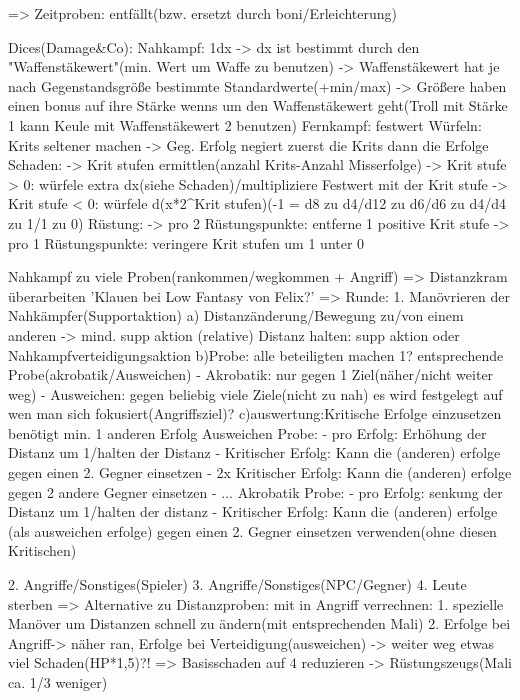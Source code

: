 	=> Zeitproben: entfällt(bzw. ersetzt durch boni/Erleichterung)
	
Dices(Damage&Co):
	Nahkampf: 1dx
		-> dx ist bestimmt durch den "Waffenstäkewert"(min. Wert um Waffe zu benutzen)
		-> Waffenstäkewert hat je nach Gegenstandsgröße bestimmte Standardwerte(+min/max)
		-> Größere haben einen bonus auf ihre Stärke wenns um den Waffenstäkewert geht(Troll mit Stärke 1 kann Keule mit Waffenstäkewert 2 benutzen)
	Fernkampf: festwert
	Würfeln: Krits seltener machen -> Geg. Erfolg negiert zuerst die Krits dann die Erfolge
	Schaden: 
		-> Krit stufen ermittlen(anzahl Krits-Anzahl Misserfolge)
		-> Krit stufe > 0: würfele extra dx(siehe Schaden)/multipliziere Festwert mit der Krit stufe
		-> Krit stufe < 0: würfele d(x*2^Krit stufen)(-1 = d8 zu d4/d12 zu d6/d6 zu d4/d4 zu 1/1 zu 0)
	Rüstung:
		-> pro 2 Rüstungspunkte: entferne 1 positive Krit stufe
		-> pro 1 Rüstungspunkte: veringere Krit stufen um 1 unter 0


Nahkampf zu viele Proben(rankommen/wegkommen + Angriff)
	=> Distanzkram überarbeiten
		'Klauen bei Low Fantasy von Felix?'
			=> Runde: 
				1. Manövrieren der Nahkämpfer(Supportaktion)
					a)
						Distanzänderung/Bewegung zu/von einem anderen -> mind. supp aktion
						(relative) Distanz halten: supp aktion oder Nahkampfverteidigungsaktion
					b)Probe:
						alle beteiligten machen 1? entsprechende Probe(akrobatik/Ausweichen)
							- Akrobatik: nur gegen 1 Ziel(näher/nicht weiter weg)
							- Ausweichen: gegen beliebig viele Ziele(nicht zu nah)
						es wird festgelegt auf wen man sich fokusiert(Angriffsziel)?
					c)auswertung:Kritische Erfolge einzusetzen benötigt min. 1 anderen Erfolg
						Ausweichen Probe:
							- pro Erfolg: Erhöhung der Distanz um 1/halten der Distanz
							- Kritischer Erfolg: Kann die (anderen) erfolge gegen einen 2. Gegner einsetzen
							- 2x Kritischer Erfolg: Kann die (anderen) erfolge gegen 2 andere Gegner einsetzen
							- ...
 						Akrobatik Probe:
							- pro Erfolg: senkung der Distanz um 1/halten der distanz
							- Kritischer Erfolg: Kann die (anderen) erfolge (als ausweichen erfolge) gegen einen 2. Gegner einsetzen
verwenden(ohne diesen Kritischen)
												
				2. Angriffe/Sonstiges(Spieler)
				3. Angriffe/Sonstiges(NPC/Gegner)
				4. Leute sterben
		=> Alternative zu Distanzproben: mit in Angriff verrechnen: 
				1. spezielle Manöver um Distanzen schnell zu ändern(mit entsprechenden Mali)
				2. Erfolge bei Angriff-> näher ran, Erfolge bei Verteidigung(ausweichen) -> weiter weg
etwas viel Schaden(HP*1,5)?! => Basisschaden auf 4 reduzieren
	-> Rüstungszeugs(Mali ca. 1/3 weniger)


